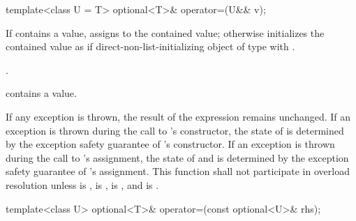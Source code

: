 %
\begin{itemdecl}
template<class U = T> optional<T>& operator=(U&& v);
\end{itemdecl}

\begin{itemdescr}
\pnum
\effects
If  contains a value, assigns  to the contained value; otherwise initializes the contained value as if direct-non-list-initializing object of type  with .

\pnum
\returns
{}.

\pnum
\ensures
{} contains a value.

\pnum
\remarks
If any exception is thrown, the result of the expression  remains unchanged. If an exception is thrown during the call to 's constructor, the state of  is determined by the exception safety guarantee of 's constructor. If an exception is thrown during the call to 's assignment, the state of  and  is determined by the exception safety guarantee of 's assignment.
This function shall not participate in overload resolution unless
 is ,
 is ,
 is , and
 is .
\end{itemdescr}

%
\begin{itemdecl}
template<class U> optional<T>& operator=(const optional<U>& rhs);
\end{itemdecl}

